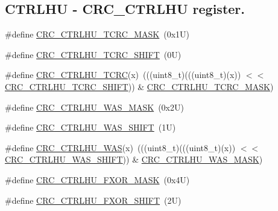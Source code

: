\subsection*{C\+T\+R\+L\+HU -\/ C\+R\+C\+\_\+\+C\+T\+R\+L\+HU register.}
\begin{DoxyCompactItemize}
\item 
\#define \mbox{\hyperlink{group___c_r_c___register___masks_ga1d62eb284fb7d178fddaf03e10dcd19c}{C\+R\+C\+\_\+\+C\+T\+R\+L\+H\+U\+\_\+\+T\+C\+R\+C\+\_\+\+M\+A\+SK}}~(0x1\+U)
\item 
\#define \mbox{\hyperlink{group___c_r_c___register___masks_ga9299763dd32745d443ab84a9911ad775}{C\+R\+C\+\_\+\+C\+T\+R\+L\+H\+U\+\_\+\+T\+C\+R\+C\+\_\+\+S\+H\+I\+FT}}~(0\+U)
\item 
\#define \mbox{\hyperlink{group___c_r_c___register___masks_ga7314f5041b73274c25b67aad48bf09f7}{C\+R\+C\+\_\+\+C\+T\+R\+L\+H\+U\+\_\+\+T\+C\+RC}}(x)~(((uint8\+\_\+t)(((uint8\+\_\+t)(x)) $<$$<$ \mbox{\hyperlink{group___c_r_c___register___masks_ga9299763dd32745d443ab84a9911ad775}{C\+R\+C\+\_\+\+C\+T\+R\+L\+H\+U\+\_\+\+T\+C\+R\+C\+\_\+\+S\+H\+I\+FT}})) \& \mbox{\hyperlink{group___c_r_c___register___masks_ga1d62eb284fb7d178fddaf03e10dcd19c}{C\+R\+C\+\_\+\+C\+T\+R\+L\+H\+U\+\_\+\+T\+C\+R\+C\+\_\+\+M\+A\+SK}})
\item 
\#define \mbox{\hyperlink{group___c_r_c___register___masks_ga9c716f81782ec7e214f823ef98fa8eb3}{C\+R\+C\+\_\+\+C\+T\+R\+L\+H\+U\+\_\+\+W\+A\+S\+\_\+\+M\+A\+SK}}~(0x2\+U)
\item 
\#define \mbox{\hyperlink{group___c_r_c___register___masks_gacd050b23263379193cf9cde3e1567ab1}{C\+R\+C\+\_\+\+C\+T\+R\+L\+H\+U\+\_\+\+W\+A\+S\+\_\+\+S\+H\+I\+FT}}~(1\+U)
\item 
\#define \mbox{\hyperlink{group___c_r_c___register___masks_ga6cc58f8e359667e00d61196933cf7f02}{C\+R\+C\+\_\+\+C\+T\+R\+L\+H\+U\+\_\+\+W\+AS}}(x)~(((uint8\+\_\+t)(((uint8\+\_\+t)(x)) $<$$<$ \mbox{\hyperlink{group___c_r_c___register___masks_gacd050b23263379193cf9cde3e1567ab1}{C\+R\+C\+\_\+\+C\+T\+R\+L\+H\+U\+\_\+\+W\+A\+S\+\_\+\+S\+H\+I\+FT}})) \& \mbox{\hyperlink{group___c_r_c___register___masks_ga9c716f81782ec7e214f823ef98fa8eb3}{C\+R\+C\+\_\+\+C\+T\+R\+L\+H\+U\+\_\+\+W\+A\+S\+\_\+\+M\+A\+SK}})
\item 
\#define \mbox{\hyperlink{group___c_r_c___register___masks_ga0a552f60712b28cd96e939d4324157df}{C\+R\+C\+\_\+\+C\+T\+R\+L\+H\+U\+\_\+\+F\+X\+O\+R\+\_\+\+M\+A\+SK}}~(0x4\+U)
\item 
\#define \mbox{\hyperlink{group___c_r_c___register___masks_ga505ca51d1aad1610b44bad4580f2637f}{C\+R\+C\+\_\+\+C\+T\+R\+L\+H\+U\+\_\+\+F\+X\+O\+R\+\_\+\+S\+H\+I\+FT}}~(2\+U)

\end{DoxyCompactItemize}
